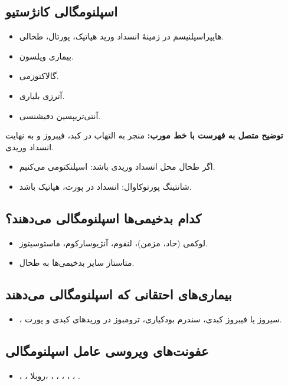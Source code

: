 \documentclass[12pt,a4paper]{article}
\begin{document}
\subsection*{اسپلنومگالی کانژستیو}
\begin{itemize}
\item هایپراسپلنیسم در زمینهٔ انسداد ورید هپاتیک، پورتال، طحالی.
\item بیماری ویلسون.
\item گالاکتوزمی.
\item آترزی بلیاری.
\item {} آنتی‌تریپسین دفیشنسی.
\end{itemize}
\textbf{توضیح متصل به فهرست با خط مورب:} منجر به التهاب در کبد، فیبروز و به نهایت انسداد وریدی.
\begin{itemize}
\item اگر طحال محل انسداد وریدی باشد: اسپلنکتومی می‌کنیم.
\item شانتینگ پورتوکاوال: انسداد در پورت، هپاتیک باشد.
\end{itemize}

\subsection*{کدام بدخیمی‌ها اسپلنومگالی می‌دهند؟}
\begin{itemize}
\item لوکمی (حاد، مزمن)، لنفوم، آنژیوسارکوم، ماستوسیتوز.
\item متاستاز سایر بدخیمی‌ها به طحال.
\end{itemize}

\subsection*{بیماری‌های احتقانی که اسپلنومگالی می‌دهند}
\begin{itemize}
\item {}، سیروز یا فیبروز کبدی، سندرم بودکیاری، ترومبوز در وریدهای کبدی و پورت.
\end{itemize}

\subsection*{عفونت‌های ویروسی عامل اسپلنومگالی}
\begin{itemize}
\item {}، ، روبلا، ، ، ، ، ، .
\end{itemize}
\end{document}
